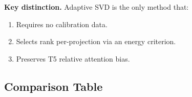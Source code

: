 \textbf{Key distinction.} Adaptive SVD is the only method that:
\begin{enumerate}
\item Requires no calibration data.
\item Selects rank per-projection via an energy criterion.
\item Preserves T5 relative attention bias.

\end{enumerate}
\subsection{Comparison Table}

